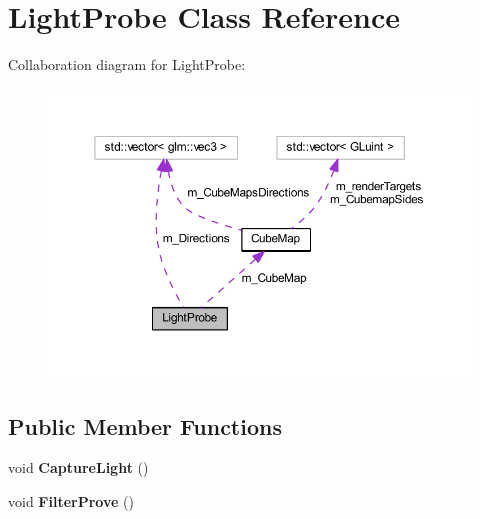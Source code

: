 \hypertarget{class_light_probe}{}\section{Light\+Probe Class Reference}
\label{class_light_probe}


Collaboration diagram for Light\+Probe\+:
\nopagebreak
\begin{figure}[H]
\begin{center}
\leavevmode
\includegraphics[width=350pt]{class_light_probe__coll__graph}
\end{center}
\end{figure}
\subsection*{Public Member Functions}
\begin{DoxyCompactItemize}
\item 
void {\bfseries Capture\+Light} ()\hypertarget{class_light_probe_a316fa741d9c8d6a0700a5de267654477}{}\label{class_light_probe_a316fa741d9c8d6a0700a5de267654477}

\item 
void {\bfseries Filter\+Prove} ()\hypertarget{class_light_probe_a1ac02f9718c11e97dd9e272a60822631}{}\label{class_light_probe_a1ac02f9718c11e97dd9e272a60822631}

\end{DoxyCompactItemize}
